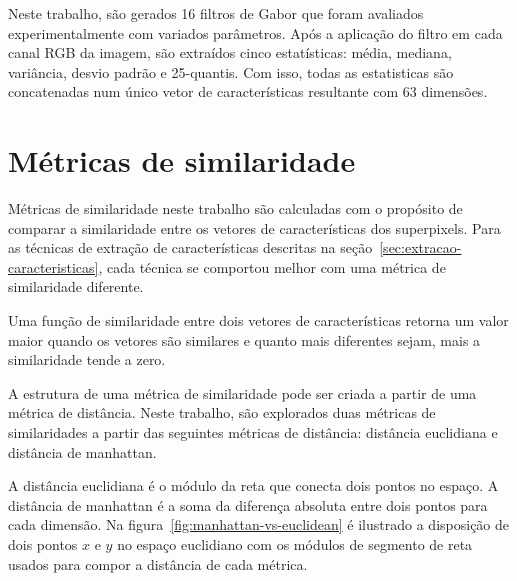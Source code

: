 Neste trabalho, são gerados 16 filtros de Gabor que foram avaliados
experimentalmente com variados parâmetros. Após a aplicação do filtro
em cada canal RGB da imagem, são extraídos cinco estatísticas: média,
mediana, variância, desvio padrão e 25-quantis. Com isso, todas as
estatisticas são concatenadas num único vetor de características
resultante com 63 dimensões.

\section{Métricas de similaridade}\label{sec:teorica-metricas-de-similaridade}


Métricas de similaridade neste trabalho são calculadas com o propósito
de comparar a similaridade entre os vetores de características dos
superpixels. Para as técnicas de extração de características descritas
na seção~\ref{sec:extracao-caracteristicas}, cada técnica se comportou
melhor com uma métrica de similaridade diferente.

Uma função de similaridade entre dois vetores de características
retorna um valor maior quando os vetores são similares e quanto mais
diferentes sejam, mais a similaridade tende a zero.

A estrutura de uma métrica de similaridade pode ser criada a partir de
uma métrica de distância. Neste trabalho, são explorados duas métricas de
similaridades a partir das seguintes métricas de distância: distância
euclidiana e distância de manhattan.

A distância euclidiana é o módulo da reta que conecta dois pontos no
espaço. A distância de manhattan é a soma da diferença absoluta entre
dois pontos para cada dimensão. Na
figura~\ref{fig:manhattan-vs-euclidean} é ilustrado a disposição de
dois pontos $ x $ e $ y $ no espaço euclidiano com os módulos de
segmento de reta usados para compor a distância de cada métrica.

\begin{figure}[!h]
        \captionsetup{width=8cm}
		\centering
\end{figure}
\FloatBarrier{}

